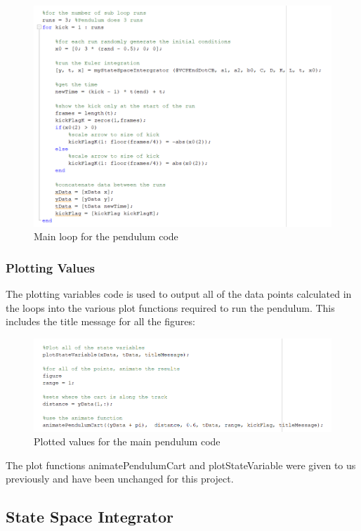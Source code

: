 \documentclass[11pt]{report}
\begin{document}
\begin{figure}[H]
\centerline{\includegraphics[width=12cm]{loopMain.png}}
\caption{Main loop for the pendulum code}
\label{fig}
\end{figure} 

\subsubsection{Plotting Values}

The plotting variables code is used to output all of the data points calculated in the loops into the various plot functions required to run the pendulum. This includes the title message for all the figures: 

\begin{figure}[H]
\centerline{\includegraphics[width=12cm]{plotMain.png}}
\caption{Plotted values for the main pendulum code}
\label{fig}
\end{figure} 

The plot functions animatePendulumCart and plotStateVariable were given to us previously and have been unchanged for this project.

\subsection{State Space Integrator}  
\end{document}
